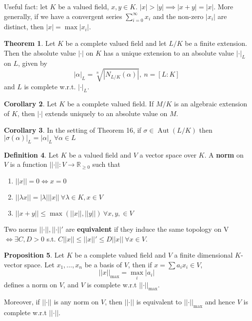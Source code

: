\documentclass[a4paper]{article}
\theoremstyle{definition}
\newtheorem{definition}{Definition}
\theoremstyle{default}
\newtheorem{theorem}[definition]{Theorem}
\newtheorem{prop}[definition]{Proposition}
\newtheorem{corollary}[definition]{Corollary}
\theoremstyle{remark}
\newcommand*\abs[1]{\left|#1\right|}
\newcommand*\norm[1]{\abs{\abs{#1}}}
\DeclareMathOperator{\Aut}{Aut}
\begin{document}
Useful fact: let $K$ be a valued field, $x, y \in K$. $\abs{x} > \abs{y} \implies \abs{x+y} = \abs{x}$.
More generally, if we have a convergent series $\sum_{i=0}^\infty x_i$ and the non-zero $\abs{x_i}$ are distinct,
then $\abs{x} = \max \abs{x_i}$.

\begin{theorem}
	Let $K$ be a complete valued field and let $L/K$ be a finite extension.
	Then the absolute value $\abs{\cdot}$ on $K$ has a unique extension to an absolute value $\abs{\cdot}_L$ on $L$,
	given by $$\abs{\alpha}_L = \sqrt[n]{\abs{N_{L/K}(\alpha)}},\ n=[L:K]$$
	and $L$ is complete w.r.t. $\abs{\cdot}_L$. 
	\label{29}
\end{theorem}

\begin{corollary}
	Let $K$ be a complete valued field. 
	If $M/K$ is an algebraic extension of $K$,
	then $\abs{\cdot}$ extends uniquely to an absolute value on $M$.
\end{corollary}

\begin{corollary}
	In the setting of Theorem 16, if $\sigma \in \Aut(L/K)$ then $\abs{\sigma(\alpha)}_L = \abs{\alpha}_L\ \forall \alpha \in L$
\end{corollary}

\begin{definition}
	Let $K$ be a valued field and $V$ a vector space over $K$. A \textbf{norm} on $V$ is a function $\norm{\cdot}: V \to \mathbb{R}_{\geq 0}$ such that
	\begin{enumerate}[label=\roman*.]
		\item $\norm{x} = 0 \iff x = 0$
		\item $\norm{\lambda x} = \abs{\lambda}\norm{x}\ \forall \lambda \in K, x \in V$
		\item $\norm{x+y} \leq \max(\norm{x}, \norm{y})\ \forall x,y, \in V$
	\end{enumerate}
	Two norms $\norm{\cdot}, \norm{\cdot}'$ are \textbf{equivalent} if they induce the same topology on V
	$\iff \exists C,D > 0$ s.t. $C\norm{x} \leq \norm{x}' \leq D\norm{x}\ \forall x \in V$.
\end{definition}

\begin{prop}
	Let $K$ be a complete valued field and $V$ a finite dimensional $K$-vector space.
	Let $x_1, \dots, x_n$ be a basis of $V$, 
	then if $x = \sum a_i x_i \in V$, 
	$$\norm{x}_{\max} = \max_i \abs{a_i}$$ defines a norm on $V$, 
	and $V$ is complete w.r.t $\norm{\cdot}_{\max}$.
	
	Moreover, if $\norm{\cdot}$ is any norm on $V$, 
	then $\norm{\cdot}$ is equivalent to $\norm{\cdot}_{\max}$ and hence $V$ is complete w.r.t $\norm{\cdot}$.
	\label{33}
\end{prop}
	
\end{document}

